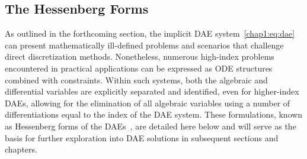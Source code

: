 \subsection{The Hessenberg Forms}

As outlined in the forthcoming section, the implicit \ac{DAE} system~\eqref{chap1:eq:dae} can present mathematically ill-defined problems and scenarios that challenge direct discretization methods. Nonetheless, numerous high-index problems encountered in practical applications can be expressed as \ac{ODE} structures combined with constraints. Within such systems, both the algebraic and differential variables are explicitly separated and identified, even for higher-index \acp{DAE}, allowing for the elimination of all algebraic variables using a number of differentiations equal to the index of the \ac{DAE} system. These formulations, known as Hessenberg forms of the \acp{DAE}~\cite{brenan1995numerical}, are detailed here below and will serve as the basis for further exploration into \ac{DAE} solutions in subsequent sections and chapters.
%
